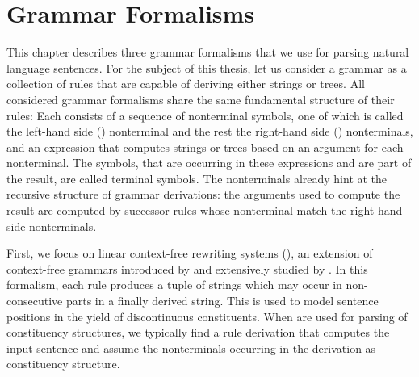 \documentclass[../document.tex]{subfiles}
\begin{document}
    \newcommand{\lcfrs}{linear context-free rewriting system}
    \newcommand{\dcp}{definite clause program}
    \chapter{Grammar Formalisms}
    This chapter describes three grammar formalisms that we use for parsing natural language sentences.
    For the subject of this thesis, let us consider a grammar as a collection of rules that are capable of deriving either strings or trees.
    All considered grammar formalisms share the same fundamental structure of their rules:
        Each consists of a sequence of nonterminal symbols, one of which is called the left-hand side () nonterminal and the rest the right-hand side () nonterminals, and an expression that computes strings or trees based on an argument for each  nonterminal.
        The symbols, that are occurring in these expressions and are part of the result, are called terminal symbols.
    The nonterminals already hint at the recursive structure of grammar derivations: the arguments used to compute the result are computed by successor rules whose  nonterminal match the right-hand side nonterminals.


    First, we focus on linear context-free rewriting systems (), an extension of context-free grammars introduced by \citet{VijWeiJos87} and extensively studied by \citet{SekMatFujKas91}.
    In this formalism, each rule produces a tuple of strings which may occur in non-consecutive parts in a finally derived string.
    This is used to model sentence positions in the yield of discontinuous constituents.
    When  are used for parsing of constituency structures, we typically find a rule derivation that computes the input sentence and assume the nonterminals occurring in the derivation as constituency structure.
\end{document}
